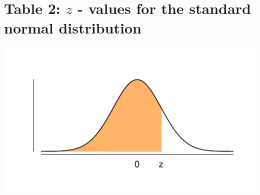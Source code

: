 \section{Table 2: $z$ - values for the standard normal distribution}
\label{table2}

\vspace*{-30pt}
\begin{minipage}{0.6\textwidth}
\hfill
\end{minipage}
\begin{minipage}{0.4\textwidth}
\includegraphics[width=\textwidth]{Files/Images/Normal.pdf}
\end{minipage}

